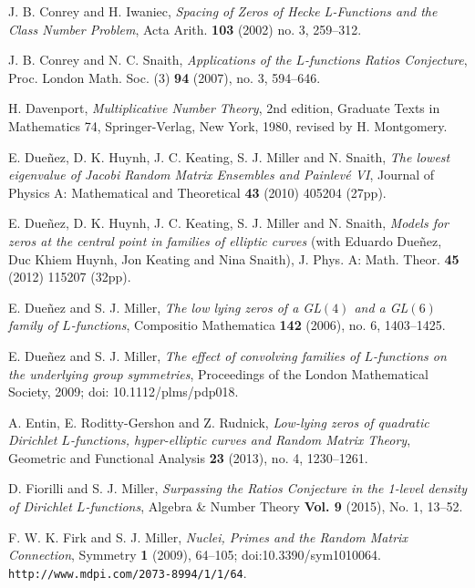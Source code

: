 \documentclass[12pt, reqno]{amsart}
\numberwithin{equation}{section}
\theoremstyle{definition}
\theoremstyle{remark}
\begin{document}
\begin{thebibliography}{FMGGGG15}
J. B. Conrey and H. Iwaniec, \emph{Spacing of Zeros of Hecke L-Functions and the Class Number Problem}, Acta Arith. \textbf{103} (2002) no. 3, 259--312.

\newblock J. B. Conrey and N. C. Snaith, \emph{Applications of the
$L$-functions Ratios Conjecture},  Proc. London Math. Soc. (3) \textbf{94} (2007), no. 3, 594--646.

H. Davenport, \emph{Multiplicative Number Theory}, 2nd edition, Graduate Texts in Mathematics
74, Springer-Verlag, New York, 1980, revised by H. Montgomery.

\newblock E. Due\~nez, D. K. Huynh, J. C. Keating, S. J. Miller and N. Snaith, \emph{The lowest eigenvalue of Jacobi Random Matrix Ensembles and Painlev\'e VI}, Journal of Physics A: Mathematical and Theoretical \textbf{43} (2010) 405204 (27pp).

\newblock E. Due\~nez, D. K. Huynh, J. C. Keating, S. J. Miller and N. Snaith, \emph{Models for zeros at the central point in families of elliptic curves} (with Eduardo Due\~nez, Duc Khiem Huynh, Jon Keating and Nina Snaith), J. Phys. A: Math. Theor. \textbf{45} (2012) 115207 (32pp).


\newblock E. Due\~nez and S. J. Miller, \emph{The low lying zeros of a
GL$(4)$ and a GL$(6)$ family of $L$-functions}, Compositio Mathematica \textbf{142} (2006), no. 6, 1403--1425.

\newblock  E. Due\~nez and S. J. Miller, \emph{The effect of convolving families of $L$-functions on the underlying group symmetries}, Proceedings of the London Mathematical Society, 2009; doi: 10.1112/plms/pdp018.

A. Entin, E. Roditty-Gershon and Z. Rudnick, \emph{Low-lying zeros of quadratic Dirichlet $L$-functions, hyper-elliptic curves and Random Matrix Theory}, Geometric and Functional Analysis \textbf{23} (2013), no. 4, 1230--1261.

D. Fiorilli and S. J. Miller, \emph{Surpassing the Ratios Conjecture in the 1-level density of Dirichlet $L$-functions}, Algebra \& Number Theory \textbf{Vol. 9} (2015), No. 1, 13--52.

F. W. K. Firk and S. J. Miller, \emph{Nuclei, Primes and the Random Matrix Connection}, Symmetry \textbf{1} (2009), 64--105; doi:10.3390/sym1010064. \texttt{http://www.mdpi.com/2073-8994/1/1/64}.


\end{thebibliography}
\end{document}
